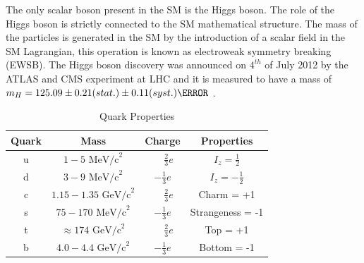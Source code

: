 The only scalar boson present in the SM is the Higgs boson. The role of the Higgs boson is strictly connected to the SM mathematical structure.
The mass of the particles is generated in the SM by the introduction of a scalar field in the SM Lagrangian, this operation is known as electroweak symmetry breaking (EWSB).
The Higgs boson discovery was announced on $4^{th}$ of July 2012 by the ATLAS and CMS experiment at LHC and it is measured to have a mass of $m_H=125.09\pm0.21(stat.)\pm0.11(syst.) \GeV$ \cite{higgs_mass}. 


\begin{table}
\begin{center}
\begin{tabular}{|c|c|c|c|}
\hline
Quark & Mass & Charge & Properties \\
\hline
u & $1-5 \mbox{ MeV/c}^2$         & $\phantom{-}\frac{2}{3} e$  & $I_{z} = \frac{1}{2}$ \\
d & $3-9 \mbox{ MeV/c}^2$         & $-\frac{1}{3} e$ & $I_{z} = -\frac{1}{2}$ \\
c & $1.15-1.35 \mbox{ GeV/c}^2$   & $\phantom{-}\frac{2}{3} e$  & Charm = +1 \\
s & $75-170 \mbox{ MeV/c}^2$      & $-\frac{1}{3} e$ & Strangeness = -1 \\
t & $\approx 174 \mbox{ GeV/c}^2$ & $\phantom{-}\frac{2}{3} e$  & Top = +1 \\
b & $4.0-4.4 \mbox{ GeV/c}^2$     & $-\frac{1}{3} e$ & Bottom = -1 \\
\hline
\end{tabular}
\caption{Quark Properties}
\label{table:quark_properties}
\end{center}
\end{table}




